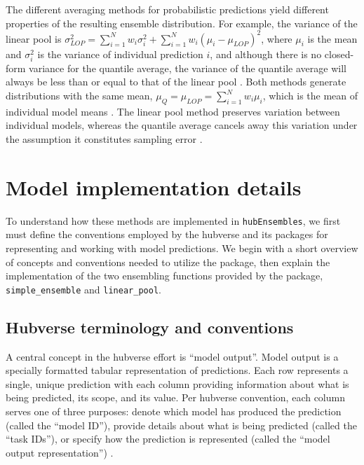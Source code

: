 \documentclass[
  article,
  shortnames,
  notitle]{jss}
\begin{document}
The different averaging methods for probabilistic predictions yield
different properties of the resulting ensemble distribution. For
example, the variance of the linear pool is
\(\sigma^2_{LOP} = \sum_{i=1}^Nw_i\sigma_i^2 + \sum_{i=1}^Nw_i(\mu_i-\mu_{LOP})^2\),
where \(\mu_i\) is the mean and \(\sigma^2_i\) is the variance of
individual prediction \(i\), and although there is no closed-form
variance for the quantile average, the variance of the quantile average
will always be less than or equal to that of the linear pool
\citep{lichtendahl2013}. Both methods generate distributions with the
same mean, \(\mu_Q = \mu_{LOP} = \sum_{i=1}^Nw_i\mu_i\), which is the
mean of individual model means \citep{lichtendahl2013}. The linear pool
method preserves variation between individual models, whereas the
quantile average cancels away this variation under the assumption it
constitutes sampling error \citep{howerton2023}.

\section{Model implementation details}\label{sec-implementation}

To understand how these methods are implemented in
\texttt{hubEnsembles}, we first must define the conventions employed by
the hubverse and its packages for representing and working with model
predictions. We begin with a short overview of concepts and conventions
needed to utilize the  package, then explain the
implementation of the two ensembling functions provided by the package,
\texttt{simple\_ensemble} and \texttt{linear\_pool}.

\subsection{Hubverse terminology and
conventions}\label{hubverse-terminology-and-conventions}

A central concept in the hubverse effort is ``model output''. Model
output is a specially formatted tabular representation of predictions.
Each row represents a single, unique prediction with each column
providing information about what is being predicted, its scope, and its
value. Per hubverse convention, each column serves one of three
purposes: denote which model has produced the prediction (called the
``model ID''), provide details about what is being predicted (called the
``task IDs''), or specify how the prediction is represented (called the
``model output representation'') \citep{hubverse_docs}.
\end{document}

